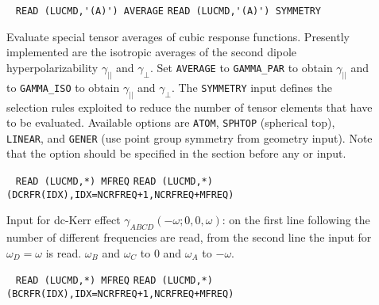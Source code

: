 \begin{center}
\end{center}

\begin{description}
\item[] \verb| |\newline
\verb|READ (LUCMD,'(A)') AVERAGE|\newline
\verb|READ (LUCMD,'(A)') SYMMETRY|

Evaluate special tensor averages of cubic response functions.
Presently implemented are the isotropic averages of the second
dipole hyperpolarizability
$\gamma_{||}$ and $\gamma_{\bot}$.
Set \verb+AVERAGE+ to \verb+GAMMA_PAR+ 
to obtain $\gamma_{||}$ and to
\verb+GAMMA_ISO+ to obtain $\gamma_{||}$ and $\gamma_{\bot}$.
The \verb+SYMMETRY+ input defines the selection rules 
exploited to reduce the number of tensor elements that have to be
evaluated. Available options are
\verb+ATOM+, \verb+SPHTOP+ (spherical top), \verb+LINEAR+,
and \verb+GENER+ (use point group symmetry from geometry input).
Note that the  option should be specified in the 
section before any  or  input.
 
\item[] \verb| |\newline
\verb|READ (LUCMD,*) MFREQ|\newline
\verb|READ (LUCMD,*) (DCRFR(IDX),IDX=NCRFREQ+1,NCRFREQ+MFREQ)|

Input for dc-Kerr effect $\gamma_{ABCD}(-\omega;0,0,\omega)$:
on the first line following  the number of different
frequencies are read, from the second line the input for
$\omega_D = \omega$ is read. $\omega_B$ and $\omega_C$ to $0$
and $\omega_A$ to $-\omega$. 
 
\item[] \verb| |\newline
\verb|READ (LUCMD,*) MFREQ|\newline
\verb|READ (LUCMD,*) (BCRFR(IDX),IDX=NCRFREQ+1,NCRFREQ+MFREQ)|


\end{description}
